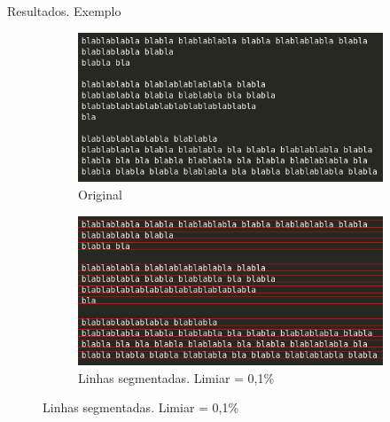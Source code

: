 \documentclass{beamer}
\begin{document}
\begin{frame}[allowframebreaks]{Resultados. Exemplo}

\begin{figure}
    \centering
    \begin{subfigure}[]{0.6\textwidth}
        \centering
        \includegraphics[width=\textwidth]{images/blabla.png}
        \caption{Original}
    \end{subfigure}
    \begin{subfigure}[]{0.6\textwidth}
        \centering
        \includegraphics[width=\textwidth]{images/blabla_lines_001.png}
        \caption{Linhas segmentadas. Limiar = 0,1\%}
    \end{subfigure}
\end{figure}

\framebreak


\end{frame}
\end{document}
